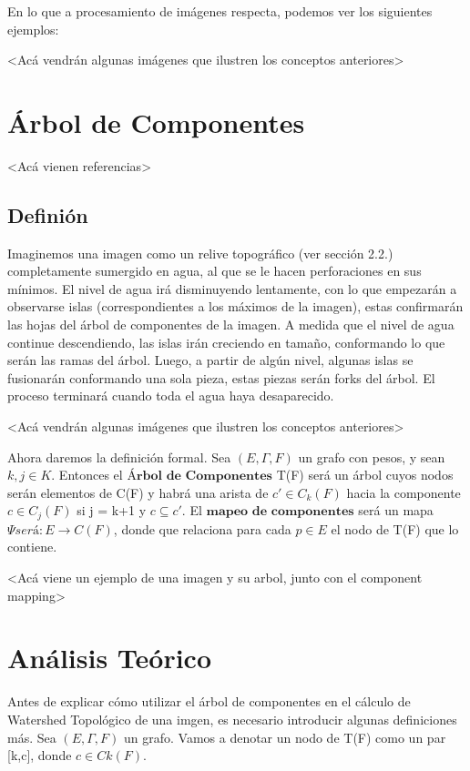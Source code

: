 En lo que a procesamiento de imágenes respecta, podemos ver los siguientes ejemplos:

<Acá vendrán algunas imágenes que ilustren los conceptos anteriores>

\section{Árbol de Componentes}

<Acá vienen referencias>

\subsection{Definión}

Imaginemos una imagen como un relive topográfico (ver sección 2.2.) completamente sumergido en agua, al que se le hacen perforaciones en sus mínimos. El nivel de agua irá disminuyendo lentamente, con lo que empezarán a observarse islas (correspondientes a los máximos de la imagen), estas confirmarán las hojas del árbol de componentes de la imagen. A medida que el nivel de agua continue descendiendo, las islas irán creciendo en tamaño, conformando lo que serán las ramas del árbol. Luego, a partir de algún nivel, algunas islas se fusionarán conformando una sola pieza, estas piezas serán forks del árbol. El proceso terminará cuando toda el agua haya desaparecido.

<Acá vendrán algunas imágenes que ilustren los conceptos anteriores>

Ahora daremos la definición formal. Sea $(E,\Gamma,F)$ un grafo con pesos, y sean $k,j \in K$. Entonces el $\textbf{Árbol de Componentes}$ T(F) será un árbol cuyos nodos serán elementos de C(F) y habrá una arista de $c' \in C_k(F)$ hacia la componente $c \in C_j(F)$ si j = k+1 y $c \subseteq c'$. El $\textbf{mapeo de componentes}$ será un mapa $\Psi será  : E  \to C(F) $,  donde que relaciona para cada $p \in E$ el nodo de T(F) que lo contiene.

<Acá viene un ejemplo de una imagen y su arbol, junto con el component mapping>

\section{Análisis Teórico}

Antes de explicar cómo utilizar el árbol de componentes en el cálculo de Watershed Topológico de una imgen, es necesario introducir algunas definiciones más. Sea $(E,\Gamma,F)$ un grafo. Vamos a denotar un nodo de T(F) como un par [k,c], donde $c \in Ck(F)$.

